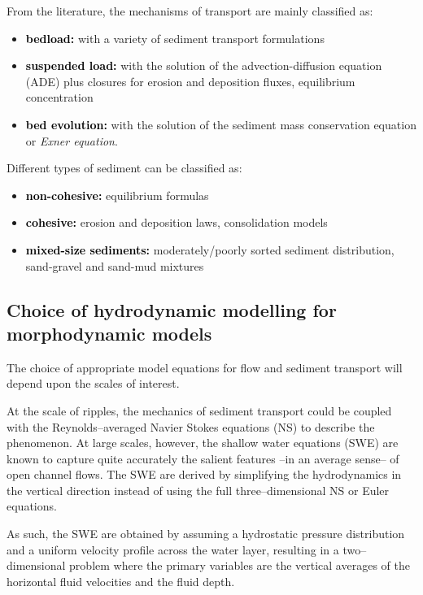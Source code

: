 \noindent
From the literature, the mechanisms of transport are mainly classified as:
\begin{itemize}
\item \textcolor{black}{\bf bedload:} with a variety of sediment transport formulations
\item \textcolor{black}{\bf suspended load:} with the solution of the advection-diffusion equation (ADE) plus closures for erosion and deposition fluxes, equilibrium concentration
\item \textcolor{black}{\bf bed evolution:} with the solution of the sediment mass conservation equation or \textit{Exner equation}.
\end{itemize}

\noindent
Different types of sediment can be classified as:
\begin{itemize}
\item \textcolor{black}{\bf non-cohesive:} equilibrium formulas
\item \textcolor{black}{\bf cohesive:} erosion and deposition laws, consolidation models
\item \textcolor{black}{\bf mixed-size sediments:} moderately/poorly sorted sediment distribution, sand-gravel and sand-mud mixtures
\end{itemize}
\noindent


\subsection{Choice of hydrodynamic modelling for morphodynamic models}
The choice of appropriate model equations for flow and sediment transport
will depend upon the scales of interest. 

At the scale of ripples, the mechanics of sediment transport could be coupled with the
Reynolds--averaged Navier Stokes equations (NS) to describe the phenomenon.
At large scales, however, the shallow water equations (SWE) are known to
capture quite accurately the salient features --in an average sense-- of 
open channel flows. The SWE are derived by simplifying the hydrodynamics in the vertical
direction instead of using the full three--dimensional NS or Euler
equations.

As such, the SWE are obtained by assuming a hydrostatic pressure
distribution and a uniform velocity profile across the water layer,
resulting in a two--dimensional problem where the primary variables are the
vertical averages of the horizontal fluid velocities and the fluid depth.

